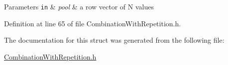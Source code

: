 \begin{DoxyParams}[1]{Parameters}
\mbox{\tt in}  & {\em pool} & a row vector of N values\\
\hline
\end{DoxyParams}


Definition at line 65 of file Combination\+With\+Repetition.\+h.



The documentation for this struct was generated from the following file\+:\begin{DoxyCompactItemize}
\item 
\hyperlink{_combination_with_repetition_8h}{Combination\+With\+Repetition.\+h}\end{DoxyCompactItemize}
